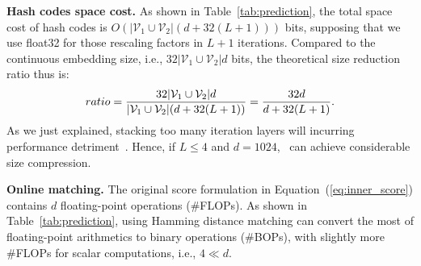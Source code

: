 \textbf{Hash codes space cost.}
As shown in Table~\ref{tab:prediction}, the total space cost of hash codes is {\small $O(|\mathcal{V}_1 \cup \mathcal{V}_2| (d+32(L+1)))$} bits, supposing that we use float32 for those rescaling factors in $L+1$ iterations.
Compared to the continuous embedding size, i.e., $32|\mathcal{V}_1 \cup \mathcal{V}_2|d$ bits, the theoretical size reduction ratio thus is:
\begin{equation}
\setlength\abovedisplayskip{2pt}
\setlength\belowdisplayskip{2pt}
\label{eq:space}
ratio = \frac{32|\mathcal{V}_1 \cup \mathcal{V}_2|d}{|\mathcal{V}_1 \cup \mathcal{V}_2| (d+32(L+1))} = \frac{32d}{d+32(L+1)}.
\end{equation}
As we just explained, stacking too many iteration layers will incurring performance detriment~\cite{li2019deepgcns}. Hence, if $L\leq4$ and $d=1024$, \model~can achieve considerable size compression. 

\vspace{0.05in}

{\textbf{Online matching.}}
The original score formulation in Equation~(\ref{eq:inner_score}) contains $d$ floating-point operations (\#FLOPs).
As shown in Table~\ref{tab:prediction}, using Hamming distance matching can convert the most of floating-point arithmetics to binary operations (\#BOPs), with slightly more \#FLOPs for scalar computations, i.e., $4\ll d$.




